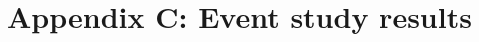 \documentclass[../main.tex]{subfiles}
\begin{document}
\section*{Appendix C: Event study results}
\label{sec:appendixc}
\end{document}
